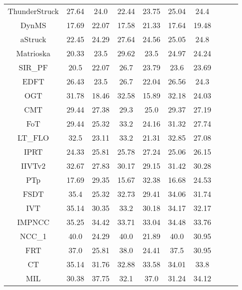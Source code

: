 \begin{tabular}{|c|c|c|c|c|c|c|c|c|c|}
ThunderStruck&27.64&24.0&22.44&23.75&25.04&24.4\\
DynMS&17.69&22.07&17.58&21.33&17.64&19.48\\
aStruck&22.45&24.29&27.64&24.56&25.05&24.8\\
Matrioska&20.33&23.5&29.62&23.5&24.97&24.24\\
SIR\_PF&20.5&22.07&26.7&23.79&23.6&23.69\\
EDFT&26.43&23.5&26.7&22.04&26.56&24.3\\
OGT&31.78&18.46&32.58&15.89&32.18&24.03\\
CMT&29.44&27.38&29.3&25.0&29.37&27.19\\
FoT&29.44&25.32&33.2&24.16&31.32&27.74\\
LT\_FLO&32.5&23.11&33.2&21.31&32.85&27.08\\
IPRT&24.33&25.81&25.78&27.24&25.06&26.15\\
IIVTv2&32.67&27.83&30.17&29.15&31.42&30.28\\
PTp&17.69&29.35&15.67&32.38&16.68&24.53\\
FSDT&35.4&25.32&32.73&29.41&34.06&31.74\\
IVT&35.14&30.35&33.2&30.18&34.17&32.17\\
IMPNCC&35.25&34.42&33.71&33.04&34.48&33.76\\
NCC\_1&40.0&24.29&40.0&21.89&40.0&30.95\\
FRT&37.0&25.81&38.0&24.41&37.5&30.95\\
CT&35.14&31.76&32.88&33.58&34.01&33.8\\
MIL&30.38&37.75&32.1&37.0&31.24&34.12\\
\hline
\end{tabular}